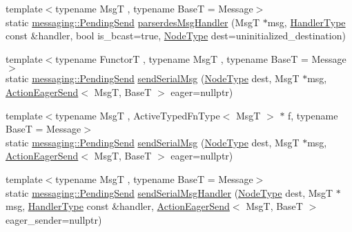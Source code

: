 \begin{DoxyCompactItemize}
\item 
{\footnotesize template$<$typename MsgT , typename BaseT  = Message$>$ }\\static \hyperlink{structvt_1_1messaging_1_1_pending_send}{messaging\+::\+Pending\+Send} \hyperlink{structvt_1_1serialization_1_1_serialized_messenger_a580f601ea65f1d413c253840b726a0f9}{parserdes\+Msg\+Handler} (MsgT $\ast$msg, \hyperlink{namespacevt_af64846b57dfcaf104da3ef6967917573}{Handler\+Type} const \&handler, bool is\+\_\+bcast=true, \hyperlink{namespacevt_a866da9d0efc19c0a1ce79e9e492f47e2}{Node\+Type} dest=uninitialized\+\_\+destination)
\item 
{\footnotesize template$<$typename FunctorT , typename MsgT , typename BaseT  = Message$>$ }\\static \hyperlink{structvt_1_1messaging_1_1_pending_send}{messaging\+::\+Pending\+Send} \hyperlink{structvt_1_1serialization_1_1_serialized_messenger_a85c14495a73a8b14588e358d9024bb42}{send\+Serial\+Msg} (\hyperlink{namespacevt_a866da9d0efc19c0a1ce79e9e492f47e2}{Node\+Type} dest, MsgT $\ast$msg, \hyperlink{namespacevt_1_1serialization_a009aa1de8d42a3c97643b947fcc6f0b6}{Action\+Eager\+Send}$<$ MsgT, BaseT $>$ eager=nullptr)
\item 
{\footnotesize template$<$typename MsgT , Active\+Typed\+Fn\+Type$<$ Msg\+T $>$ $\ast$ f, typename BaseT  = Message$>$ }\\static \hyperlink{structvt_1_1messaging_1_1_pending_send}{messaging\+::\+Pending\+Send} \hyperlink{structvt_1_1serialization_1_1_serialized_messenger_a4e284cf963329a2af22c2fba223df22f}{send\+Serial\+Msg} (\hyperlink{namespacevt_a866da9d0efc19c0a1ce79e9e492f47e2}{Node\+Type} dest, MsgT $\ast$msg, \hyperlink{namespacevt_1_1serialization_a009aa1de8d42a3c97643b947fcc6f0b6}{Action\+Eager\+Send}$<$ MsgT, BaseT $>$ eager=nullptr)
\item 
{\footnotesize template$<$typename MsgT , typename BaseT  = Message$>$ }\\static \hyperlink{structvt_1_1messaging_1_1_pending_send}{messaging\+::\+Pending\+Send} \hyperlink{structvt_1_1serialization_1_1_serialized_messenger_a550f29c7e7773b9547cd6ecf57c92c96}{send\+Serial\+Msg\+Handler} (\hyperlink{namespacevt_a866da9d0efc19c0a1ce79e9e492f47e2}{Node\+Type} dest, MsgT $\ast$msg, \hyperlink{namespacevt_af64846b57dfcaf104da3ef6967917573}{Handler\+Type} const \&handler, \hyperlink{namespacevt_1_1serialization_a009aa1de8d42a3c97643b947fcc6f0b6}{Action\+Eager\+Send}$<$ MsgT, BaseT $>$ eager\+\_\+sender=nullptr)
\item 

\end{DoxyCompactItemize}
